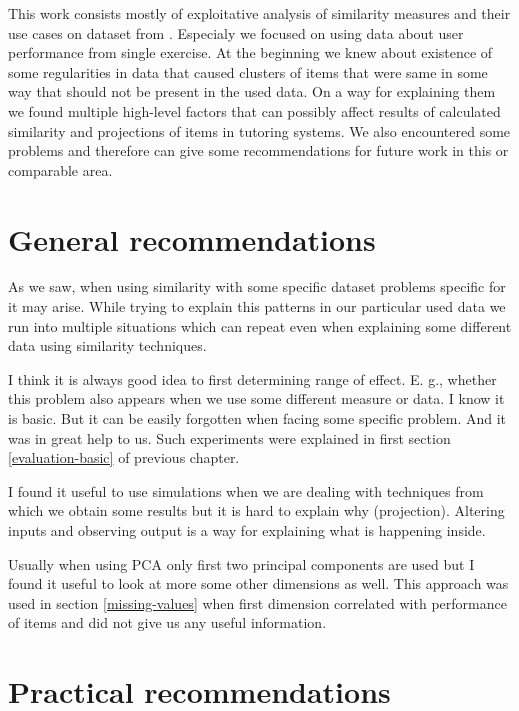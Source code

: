 \documentclass[
  digital, %
  table,   %
  nolof,     %
  nolot,     %
  nocover,
  color
]{fithesis3}
\begin{document}
This work consists mostly of exploitative analysis of similarity measures and their use cases on dataset from \umimeCesky{}. Especialy we focused on using data about user performance from single exercise. At the beginning we knew about existence of some regularities in data that caused clusters of items that were same in some way that should not be present in the used data. On a way for explaining them we found multiple high-level factors that can possibly affect results of calculated similarity and projections of items in tutoring systems. We also encountered some problems and therefore can give some recommendations for future work in this or comparable area.


\section{General recommendations}\label{general-recommendations}

As we saw, when using similarity with some specific dataset problems specific for it may arise. While trying to explain this patterns in our particular used data we run into multiple situations which can repeat even when explaining some different data using similarity techniques.


I think it is always good idea to first determining range of effect. E. g., whether this problem also appears when we use some different measure or data. I know it is basic. But it can be easily forgotten when facing some specific problem. And it was in great help to us. Such experiments were explained in first section \ref{evaluation-basic} of previous chapter.


I found it useful to use simulations when we are dealing with techniques from which we obtain some results but it is hard to explain why (projection). Altering inputs and observing output is a way for explaining what is happening inside.


Usually when using PCA only first two principal components are used but I found it useful to look at more some other dimensions as well. This approach was used in section \ref{missing-values} when first dimension correlated with performance of items and did not give us any useful information.

\section{Practical recommendations}\label{practical-recommendations}
\end{document}
